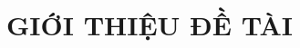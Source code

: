 \documentclass[a4paper,13pt,3p,twoside]{report}
\theoremstyle{definition}
\begin{document}
\tableofcontents 
\thispagestyle{empty}
\cleardoublepage

\renewcommand{\listfigurename}{DANH MỤC HÌNH VẼ}
{\let\oldnumberline\numberline
\renewcommand{\numberline}{Hình~\oldnumberline}
\listoffigures} 
\newpage


\renewcommand{\listtablename}{DANH MỤC BẢNG BIỂU}
{\let\oldnumberline\numberline
\renewcommand{\numberline}{Bảng~\oldnumberline}
\listoftables}

\glsaddall 
 \renewcommand*{\glossaryname}{Danh sách thuật ngữ}
\renewcommand*{\acronymname}{DANH MỤC THUẬT NGỮ VÀ TỪ VIẾT TẮT}
\renewcommand*{\entryname}{Thuật ngữ}
\renewcommand*{\descriptionname}{Ý nghĩa}
\renewcommand{\lstlistingname}{Đoạn mã} %



% 



\newpage
{}

\pagestyle{fancy}
\fancyhf{}
\fancyhead[RE, LO]{\leftmark}
\fancyfoot[RE, LO]{\thepage}

\chapter{GIỚI THIỆU ĐỀ TÀI}
\label{chapter:Introduction}
\end{document}
